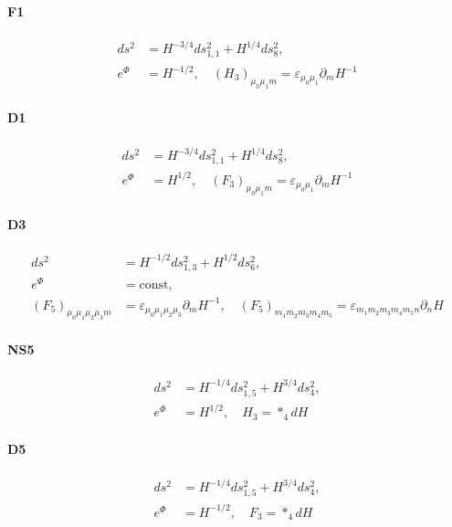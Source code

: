 \paragraph{F1}
\begin{equation}
\begin{aligned}
ds^2
&= H^{-3/4}ds_{1,1}^2 + H^{1/4}ds_8^2,\\
e^{\Phi}
&= H^{-1/2},\quad
(H_3)_{\mu_0\mu_1 m} = \varepsilon_{\mu_0 \mu_1} \partial_m H^{-1}
\end{aligned}
\end{equation}

\paragraph{D1}
\begin{equation}
\begin{aligned}
ds^2 
&= H^{-3/4}ds_{1,1}^2 + H^{1/4}ds_8^2,\\
e^{\Phi}
&= H^{1/2},\quad
(F_3)_{\mu_0\mu_1 m} = \varepsilon_{\mu_0 \mu_1} \partial_m H^{-1}
\end{aligned}
\end{equation}


\paragraph{D3}

\begin{equation}
\begin{aligned}
ds^2 
&= H^{-1/2}ds_{1,3}^2 + H^{1/2}ds_6^2,\\
e^\Phi
&= \mathrm{const},\\
(F_5)_{\mu_0\mu_1\mu_2\mu_3 m} &= \varepsilon_{\mu_0\mu_1\mu_2\mu_3}\partial_m H^{-1},\quad
(F_5)_{m_1 m_2 m_3 m_4 m_5} = \varepsilon_{m_1m_2m_3m_4m_5 n}\partial_n H
\end{aligned}
\end{equation}



\paragraph{NS5}
\begin{equation}
\begin{aligned}
ds^2 
&= H^{-1/4}ds_{1,5}^2 + H^{3/4}ds_4^2,\\
e^{\Phi}
&= H^{1/2},\quad H_3 = *_4 dH
\end{aligned}
\end{equation}

\paragraph{D5}
\begin{equation}
\begin{aligned}
ds^2 
&= H^{-1/4}ds_{1,5}^2 + H^{3/4}ds_4^2,\\
e^{\Phi}
&= H^{-1/2},\quad F_3 = *_4 dH
\end{aligned}
\end{equation}